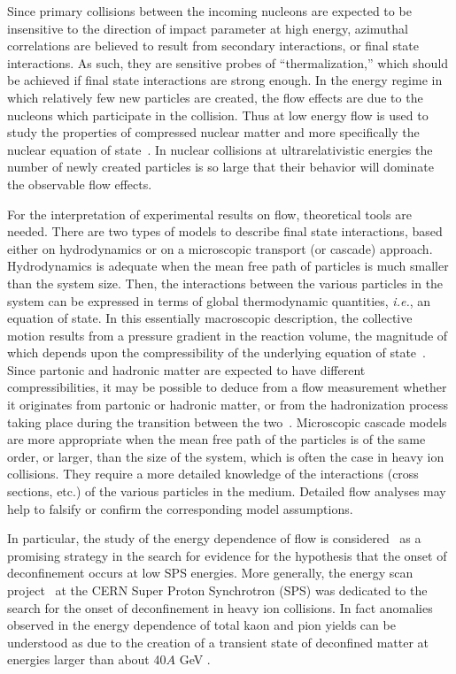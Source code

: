 \documentclass[aps,prc,superscriptaddress,showpacs,floatfix,nofootinbib]{revtex4}
\begin{document}
Since primary collisions between the incoming nucleons are expected to
be insensitive to the direction of impact parameter at high energy,
azimuthal correlations are believed to result from secondary interactions,
or final state interactions.  As such, they are sensitive probes of
``thermalization,'' which should be achieved if final state
interactions are strong enough.  In the energy regime in which
relatively few new particles are created, the flow effects are due to
the nucleons which participate in the collision. Thus at low energy
flow is used to study the properties of compressed nuclear matter and
more specifically the nuclear equation of state~\cite{WRHR}.  In
nuclear collisions at ultrarelativistic energies the number of newly
created particles is so large that their behavior will dominate the
observable flow effects.

For the interpretation of experimental results on flow, theoretical
tools are needed. There are two types of models to describe final
state interactions, based either on hydrodynamics or on a microscopic
transport (or cascade) approach. Hydrodynamics is adequate when the
mean free path of particles is much smaller than the system
size. Then, the interactions between the various particles in the
system can be expressed in terms of global thermodynamic quantities,
{\it i.e.}, an equation of state. In this essentially macroscopic
description, the collective motion results from a pressure gradient in
the reaction volume, the magnitude of which depends upon the
compressibility of the underlying equation of state~\cite{OL92}.
Since partonic and hadronic matter are expected to have different
compressibilities, it may be possible to deduce from a flow
measurement whether it originates from partonic or hadronic matter, or
from the hadronization process taking place during the transition
between the two~\cite{WRHR,DR96,OL98,PD99}. Microscopic cascade models
are more appropriate when the mean free path of the particles is of
the same order, or larger, than the size of the system, which is often
the case in heavy ion collisions. They require a more detailed
knowledge of the interactions (cross sections, etc.)  of the various
particles in the medium. Detailed flow analyses may help to falsify or
confirm the corresponding model assumptions.

In particular, the study of the energy dependence of flow is
considered~\cite{Kolb:99,Kolb:00,Teaney:01} as a promising strategy in
the search for evidence for the hypothesis that the onset of
deconfinement occurs at low SPS energies.  More generally, the energy
scan project~\cite{NA49-ADD1} at the CERN Super Proton Synchrotron
(SPS) was dedicated to the search for the onset of deconfinement in
heavy ion collisions.  In fact anomalies observed in the energy
dependence of total kaon and pion yields \cite{NA49-energy} can
be understood as due to the creation of a transient state of
deconfined matter at energies larger than about 40$A$ GeV
\cite{Gazdzicki:99}.
\end{document}
